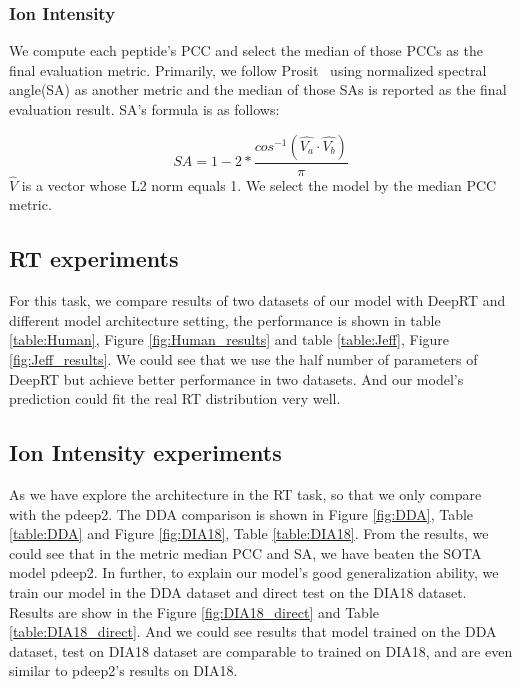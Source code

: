 \subsubsection*{Ion Intensity}
We compute each peptide's PCC and select the median of those PCCs as the final evaluation metric.
Primarily, we follow Prosit~\cite{gessulat2019prosit} using normalized
spectral angle(SA) as another metric and the median of those SAs is reported as the final evaluation result.
SA's formula is as follows:

\[ SA = 1 - 2 * \frac{cos^{-1}(\hat{V_a}\cdot\hat{V_b})}{\pi} \]
$\hat{V}$ is a vector whose L2 norm equals 1. We select the model by the median PCC metric.

\subsection{RT experiments}
For this task, we compare results of two datasets of our model with DeepRT and different model architecture setting, the performance
is shown in table \ref{table:Human}, Figure \ref{fig:Human_results} and table \ref{table:Jeff}, Figure \ref{fig:Jeff_results}. We could see that we use the
half number of parameters of DeepRT but achieve better performance in two datasets. And our model's prediction could
fit the real RT distribution very well.



%
%
%
%
%

\subsection{Ion Intensity experiments}
As we have explore the architecture in the RT task, so that we only compare with the pdeep2.
The DDA comparison is shown in Figure \ref{fig:DDA}, Table \ref{table:DDA} and Figure \ref{fig:DIA18},
Table \ref{table:DIA18}.
From the results, we could see that in the metric median PCC and SA, we have beaten the SOTA model
pdeep2. In further, to explain our model's good generalization ability, we train our model in the DDA
dataset and direct test on the DIA18 dataset. Results are show in the Figure \ref{fig:DIA18_direct} and Table \ref{table:DIA18_direct}.
And we could see results that model trained on the DDA dataset, test on DIA18 dataset are comparable to trained
on DIA18, and are even similar to pdeep2's results on DIA18.

